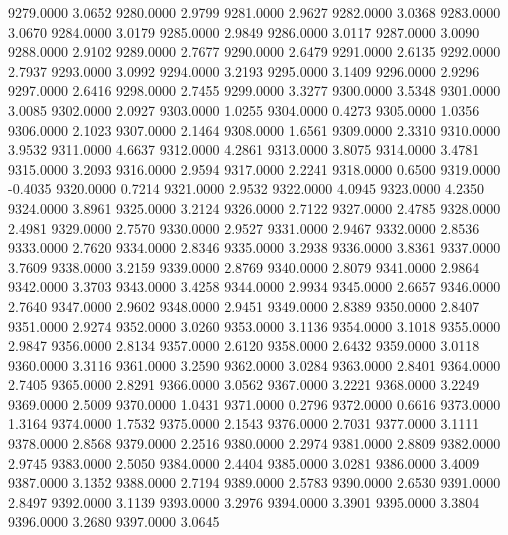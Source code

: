 9279.0000      3.0652
9280.0000      2.9799
9281.0000      2.9627
9282.0000      3.0368
9283.0000      3.0670
9284.0000      3.0179
9285.0000      2.9849
9286.0000      3.0117
9287.0000      3.0090
9288.0000      2.9102
9289.0000      2.7677
9290.0000      2.6479
9291.0000      2.6135
9292.0000      2.7937
9293.0000      3.0992
9294.0000      3.2193
9295.0000      3.1409
9296.0000      2.9296
9297.0000      2.6416
9298.0000      2.7455
9299.0000      3.3277
9300.0000      3.5348
9301.0000      3.0085
9302.0000      2.0927
9303.0000      1.0255
9304.0000      0.4273
9305.0000      1.0356
9306.0000      2.1023
9307.0000      2.1464
9308.0000      1.6561
9309.0000      2.3310
9310.0000      3.9532
9311.0000      4.6637
9312.0000      4.2861
9313.0000      3.8075
9314.0000      3.4781
9315.0000      3.2093
9316.0000      2.9594
9317.0000      2.2241
9318.0000      0.6500
9319.0000     -0.4035
9320.0000      0.7214
9321.0000      2.9532
9322.0000      4.0945
9323.0000      4.2350
9324.0000      3.8961
9325.0000      3.2124
9326.0000      2.7122
9327.0000      2.4785
9328.0000      2.4981
9329.0000      2.7570
9330.0000      2.9527
9331.0000      2.9467
9332.0000      2.8536
9333.0000      2.7620
9334.0000      2.8346
9335.0000      3.2938
9336.0000      3.8361
9337.0000      3.7609
9338.0000      3.2159
9339.0000      2.8769
9340.0000      2.8079
9341.0000      2.9864
9342.0000      3.3703
9343.0000      3.4258
9344.0000      2.9934
9345.0000      2.6657
9346.0000      2.7640
9347.0000      2.9602
9348.0000      2.9451
9349.0000      2.8389
9350.0000      2.8407
9351.0000      2.9274
9352.0000      3.0260
9353.0000      3.1136
9354.0000      3.1018
9355.0000      2.9847
9356.0000      2.8134
9357.0000      2.6120
9358.0000      2.6432
9359.0000      3.0118
9360.0000      3.3116
9361.0000      3.2590
9362.0000      3.0284
9363.0000      2.8401
9364.0000      2.7405
9365.0000      2.8291
9366.0000      3.0562
9367.0000      3.2221
9368.0000      3.2249
9369.0000      2.5009
9370.0000      1.0431
9371.0000      0.2796
9372.0000      0.6616
9373.0000      1.3164
9374.0000      1.7532
9375.0000      2.1543
9376.0000      2.7031
9377.0000      3.1111
9378.0000      2.8568
9379.0000      2.2516
9380.0000      2.2974
9381.0000      2.8809
9382.0000      2.9745
9383.0000      2.5050
9384.0000      2.4404
9385.0000      3.0281
9386.0000      3.4009
9387.0000      3.1352
9388.0000      2.7194
9389.0000      2.5783
9390.0000      2.6530
9391.0000      2.8497
9392.0000      3.1139
9393.0000      3.2976
9394.0000      3.3901
9395.0000      3.3804
9396.0000      3.2680
9397.0000      3.0645

